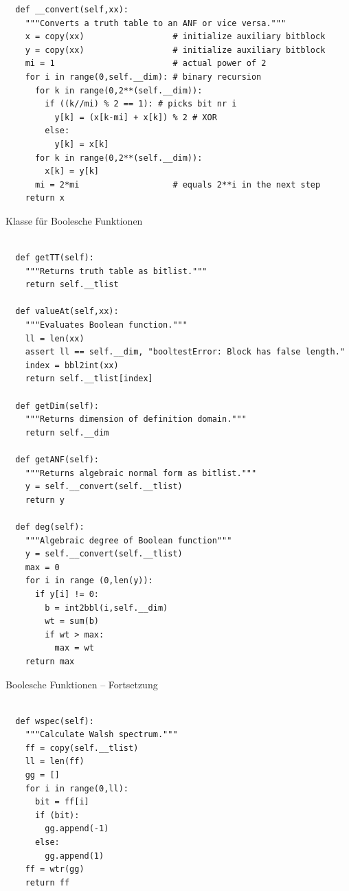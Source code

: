 \begin{refsegment}
\begin{sagecode}
\begin{verbatim}
  def __convert(self,xx):
    """Converts a truth table to an ANF or vice versa."""
    x = copy(xx)                  # initialize auxiliary bitblock
    y = copy(xx)                  # initialize auxiliary bitblock
    mi = 1                        # actual power of 2
    for i in range(0,self.__dim): # binary recursion
      for k in range(0,2**(self.__dim)):
        if ((k//mi) % 2 == 1): # picks bit nr i
          y[k] = (x[k-mi] + x[k]) % 2 # XOR
        else:
          y[k] = x[k]
      for k in range(0,2**(self.__dim)):
        x[k] = y[k]
      mi = 2*mi                   # equals 2**i in the next step
    return x
\end{verbatim}
\caption{Klasse für Boolesche Funktionen}\label{Sage-code-bool-boolF}
\end{sagecode}

\begin{sagecode}
\begin{verbatim}

  def getTT(self):
    """Returns truth table as bitlist."""
    return self.__tlist

  def valueAt(self,xx):
    """Evaluates Boolean function."""
    ll = len(xx)
    assert ll == self.__dim, "booltestError: Block has false length."
    index = bbl2int(xx)
    return self.__tlist[index]

  def getDim(self):
    """Returns dimension of definition domain."""
    return self.__dim

  def getANF(self):
    """Returns algebraic normal form as bitlist."""
    y = self.__convert(self.__tlist)
    return y

  def deg(self):
    """Algebraic degree of Boolean function"""
    y = self.__convert(self.__tlist)
    max = 0
    for i in range (0,len(y)):
      if y[i] != 0:
        b = int2bbl(i,self.__dim)
        wt = sum(b)
        if wt > max:
          max = wt
    return max
\end{verbatim}
\caption{Boolesche Funktionen
   -- Fortsetzung}\label{Sage-code-bool-bool-f1}
\end{sagecode}

\begin{sagecode}
\begin{verbatim}

  def wspec(self):
    """Calculate Walsh spectrum."""
    ff = copy(self.__tlist)
    ll = len(ff)
    gg = []
    for i in range(0,ll):
      bit = ff[i]
      if (bit):
        gg.append(-1)
      else:
        gg.append(1)
    ff = wtr(gg)
    return ff


\end{verbatim}
\end{sagecode}
\end{refsegment}
